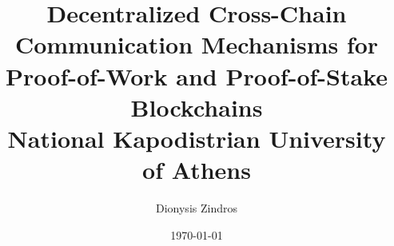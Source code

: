 \documentclass{report}
\begin{document}
\begin{titlepage}
  \title{
    {Decentralized Cross-Chain Communication Mechanisms for Proof-of-Work and Proof-of-Stake Blockchains} \\
  {\large National Kapodistrian University of Athens} \\
  }
  \author{Dionysis Zindros}
  \date{\today}
  \maketitle
\end{titlepage}

\newpage

\thispagestyle{empty}
\null

\newpage

\begin{abstract}
\end{abstract}

\newpage

\tableofcontents

\newpage


\end{document}
